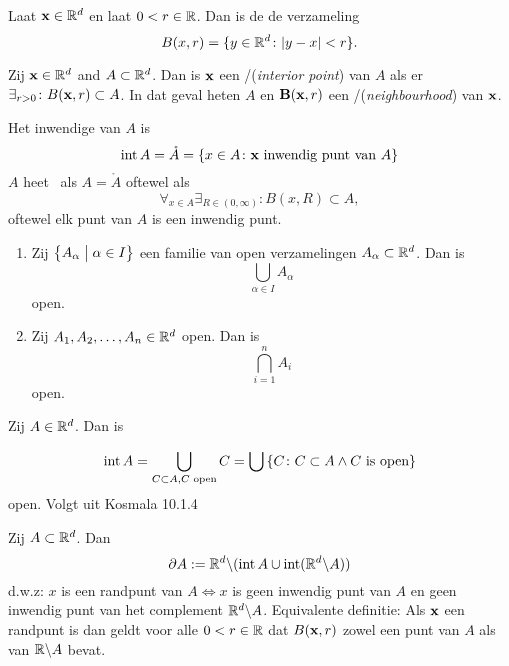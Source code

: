\documentclass{2wa40summary}
\begin{document}
	\begin{define}[Bol]
		Laat ${\textbf{x}}\in\mathbb{R}^d$ en laat $0<r\in\mathbb{R}$. Dan is de  de verzameling
		\[
		B(x,r)=\lbrace y \in \mathbb{R}^d \colon {\left|y-x\right|}<r\rbrace.
		\]
		
	\end{define}
	\begin{define} Zij ${\textbf{x}} \in \mathbb{R}^d$ and $A \subset \mathbb{R}^d$. Dan is ${\textbf{x}}$ een
		/(\textit{interior point}) van $A$
		als er $\exists_{r>0}\colon B({\textbf{x}},r) \subset A$.
		In dat geval heten $A$ en ${\textbf{B}}({\textbf{x}},r)$ een /(\textit{neighbourhood}) van ${\textbf{x}}$.
	\end{define}
	\begin{define}
		Het inwendige van $A$ is
		\[\operatorname{\mathop{int}} A=\mathring{A}=\left\lbrace x \in A \colon {\textbf{x}} \text{ inwendig punt van } A\right\rbrace\]
		$A$ heet \ als $A=\mathring{A}$ oftewel als
		\[
		\forall _{x \in A} \exists _{R \in (0,\infty)}\colon B(x,R) \subset A,
		\]
		oftewel elk punt van $A$ is een inwendig punt.
	\end{define}
	\begin{theorem}
		\begin{enumerate}[(1)]
			\item Zij $\left\lbrace A_\alpha \bigm| \alpha \in I \right\rbrace$ een familie van open verzamelingen $A_\alpha \subset \mathbb{R}^d$. Dan is
			\[
			\bigcup_{\alpha \in I}A_\alpha
			\]
			open.
			\item Zij $A_1,A_2,\dots,A_n \in \mathbb{R}^d$ open. Dan is
			\[
			\bigcap_{i=1}^{n}A_i
			\]
			open.
		\end{enumerate}
	\end{theorem}
	\begin{theorem}[Open]
		Zij $A\in\mathbb{R}^d$. Dan is
		\item \[\operatorname{\mathop{int}} A=\bigcup_{C \subset A, C \text{ open} }C=\bigcup \left\lbrace C \colon C \subset A \wedge C \text{ is open}\right\rbrace\]
		open. Volgt uit Kosmala 10.1.4
	\end{theorem}
	\begin{define}[Rand]
		Zij $A \subset \mathbb{R}^d$. Dan
		\[\partial A:= \mathbb{R}^d\backslash (\operatorname{\mathop{int}} A \cup \operatorname{\mathop{int}} (\mathbb{R}^d\backslash A))\]
		d.w.z: $x$ is een randpunt van $A \iff x$ is geen inwendig punt van $A$ en geen inwendig punt van het complement $\mathbb{R}^d\backslash A$.
		Equivalente definitie: Als ${\textbf{x}}$ een randpunt is dan geldt voor alle $0<r\in\mathbb{R}$ dat
		$B({\textbf{x}},r)$ zowel een punt van $A$ als van $\mathbb{R}\backslash A$ bevat.
	\end{define}
\end{document}
